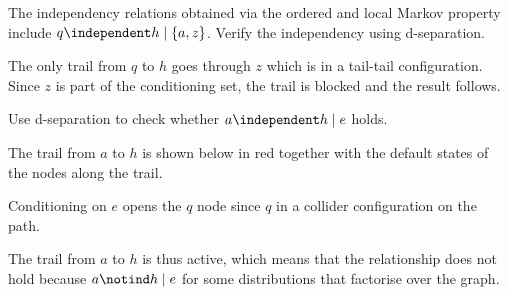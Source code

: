 \begin{exenumerate}
\begin{solution}
    \end{solution}

    
  \item The independency relations obtained via the ordered and local
    Markov property include $q \independent h \mid \{a,z\}$. Verify
    the independency using d-separation.

    \begin{solution}

     The only trail from $q$ to $h$ goes through $z$ which is in a tail-tail configuration. Since $z$ is part of the conditioning set, the trail is blocked and the result follows.
    \end{solution}

  \item Use d-separation to check whether $a \independent h \mid e$ holds.
    \begin{solution}
      The trail from $a$ to $h$ is shown below in red together with the default states of the nodes along the trail.
\begin{center}
\end{center}
Conditioning on $e$ opens the $q$ node since $q$ in a collider configuration on the path. 
\begin{center}
\end{center}
    The trail from $a$ to $h$ is thus active, which means that the relationship does not hold because  $a \notind h \mid e$ for some distributions that factorise over the graph.
    \end{solution}


\end{exenumerate}
